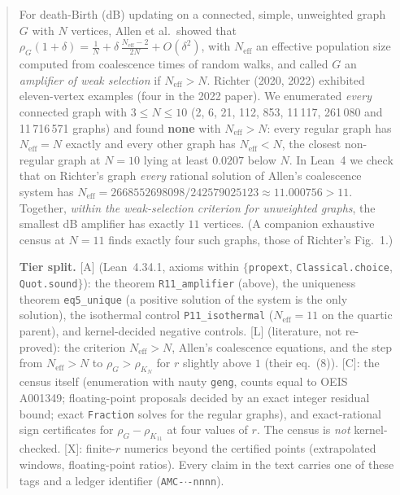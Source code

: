 \documentclass[10pt]{article}
\newcommand{\tier}[1]{\textsf{[#1]}}
\newcommand{\tA}{\tier{A}}
\newcommand{\tL}{\tier{L}}
\newcommand{\tC}{\tier{C}}
\newcommand{\tX}{\tier{X}}
\newcommand{\lean}[1]{\texttt{#1}}
\newcommand{\Neff}{N_{\mathrm{eff}}}
\begin{document}
\begin{abstract}
For death-Birth (dB) updating on a connected, simple, unweighted graph $G$ with $N$ vertices, Allen et al.\ showed that
$\rho_G(1+\delta)=\tfrac1N+\delta\,\tfrac{\Neff-2}{2N}+O(\delta^2)$, with $\Neff$ an effective population size computed
from coalescence times of random walks, and called $G$ an \emph{amplifier of weak selection} if $\Neff>N$. Richter (2020, 2022)
exhibited eleven-vertex examples (four in the 2022 paper). We enumerated \emph{every} connected graph with $3\le N\le10$ (2, 6, 21, 112, 853, 11\,117,
261\,080 and 11\,716\,571 graphs) and found \textbf{none} with $\Neff>N$: every regular graph has $\Neff=N$ exactly and
every other graph has $\Neff<N$, the closest non-regular graph at $N=10$ lying at least $0.0207$ below $N$. In Lean~4 we check
that on Richter's graph \emph{every} rational solution of Allen's coalescence system has
$\Neff=2668552698098/242579025123\approx11.000756>11$. Together, \emph{within the weak-selection criterion for unweighted
graphs}, the smallest dB amplifier has exactly $11$ vertices. (A companion exhaustive census at $N=11$ finds exactly four such graphs, those of Richter's Fig.~1.)

\textbf{Tier split.}
\tA{} (Lean~4.34.1, axioms within $\{$\lean{propext}, \lean{Classical.choice}, \lean{Quot.sound}$\}$): the theorem
\lean{R11\_amplifier} (above), the uniqueness theorem \lean{eq5\_unique} (a positive solution of the system is the only
solution), the isothermal control \lean{P11\_isothermal} ($\Neff=11$ on the quartic parent), and kernel-decided negative controls.
\tL{} (literature, not re-proved): the criterion $\Neff>N$, Allen's coalescence equations, and the step from $\Neff>N$ to
$\rho_G>\rho_{K_N}$ for $r$ slightly above $1$ (their eq.~(8)).
\tC{}: the census itself (enumeration with nauty \texttt{geng}, counts equal to OEIS A001349; floating-point proposals decided
by an exact integer residual bound; exact \texttt{Fraction} solves for the regular graphs), and exact-rational sign certificates
for $\rho_G-\rho_{K_{11}}$ at four values of $r$. The census is \emph{not} kernel-checked.
\tX{}: finite-$r$ numerics beyond the certified points (extrapolated windows, floating-point ratios).
Every claim in the text carries one of these tags and a ledger identifier (\texttt{AMC-$\cdot$-nnnn}).

\medskip
\noindent{}
\end{abstract}
\end{document}
